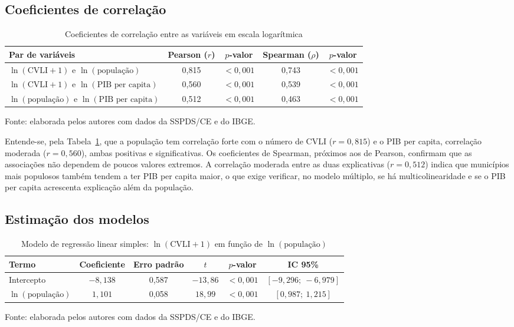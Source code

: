\documentclass[12pt,a4paper]{article}
\newcommand{\fonte}[1]{
	\vspace{-2mm}
	\begin{center}\footnotesize Fonte: #1\end{center}
}
\newcommand{\fontedados}{elaborada pelos autores com dados da SSPDS/CE e do IBGE.}
\begin{document}
	\subsection{Coeficientes de correlação}
	
	\begin{table}[H]
		\centering
		\caption{Coeficientes de correlação entre as variáveis em escala logarítmica}
		\label{tab:correlacao}
		\begin{tabular}{lcccc}
			\toprule
			\textbf{Par de variáveis} & \textbf{Pearson ($r$)} & \textbf{$p$-valor} & \textbf{Spearman ($\rho$)} & \textbf{$p$-valor} \\
			\midrule
			$\ln(\text{CVLI}+1)$ e $\ln(\text{população})$       & 0,815 & $<0{,}001$ & 0,743 & $<0{,}001$ \\
			$\ln(\text{CVLI}+1)$ e $\ln(\text{PIB per capita})$  & 0,560 & $<0{,}001$ & 0,539 & $<0{,}001$ \\
			$\ln(\text{população})$ e $\ln(\text{PIB per capita})$ & 0,512 & $<0{,}001$ & 0,463 & $<0{,}001$ \\
			\bottomrule
		\end{tabular}
	\end{table}
	\fonte{\fontedados}
	
	Entende-se, pela Tabela~\ref{tab:correlacao}, que a população tem correlação forte com o número de CVLI ($r = 0{,}815$) e o PIB per capita, correlação moderada ($r = 0{,}560$), ambas positivas e significativas. Os coeficientes de Spearman, próximos aos de Pearson, confirmam que as associações não dependem de poucos valores extremos. A correlação moderada entre as duas explicativas ($r = 0{,}512$) indica que municípios mais populosos também tendem a ter PIB per capita maior, o que exige verificar, no modelo múltiplo, se há multicolinearidade e se o PIB per capita acrescenta explicação além da população.
	
	\subsection{Estimação dos modelos}
	
	\begin{table}[H]
		\centering
		\caption{Modelo de regressão linear simples: $\ln(\text{CVLI}+1)$ em função de $\ln(\text{população})$}
		\label{tab:simples}
		\begin{tabular}{lccccc}
			\toprule
			\textbf{Termo} & \textbf{Coeficiente} & \textbf{Erro padrão} & \textbf{$t$} & \textbf{$p$-valor} & \textbf{IC 95\%} \\
			\midrule
			Intercepto              & $-8{,}138$ & 0,587 & $-13{,}86$ & $<0{,}001$ & $[-9{,}296;\ -6{,}979]$ \\
			$\ln(\text{população})$ & $1{,}101$  & 0,058 & $18{,}99$  & $<0{,}001$ & $[0{,}987;\ 1{,}215]$ \\
			\bottomrule
		\end{tabular}
	\end{table}
	\fonte{\fontedados}
	
\end{document}
